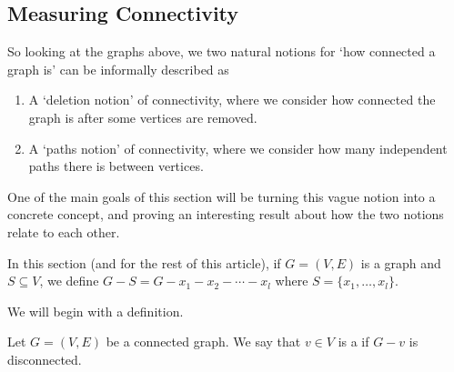 \documentclass[a4paper]{scrartcl}
\begin{document}
\subsection{Measuring Connectivity}

So looking at the graphs above, we two natural notions for `how connected a graph is' can be informally described as
\begin{enumerate}
	\item A `deletion notion' of connectivity, where we consider how connected the graph is after some vertices are removed.
	\item A `paths notion' of connectivity, where we consider how many independent paths there is between vertices.
\end{enumerate}

One of the main goals of this section will be turning this vague notion into a concrete concept, and proving an interesting result about how the two notions relate to each other.

\begin{notation}
	In this section (and for the rest of this article), if $G = (V, E)$ is a graph and $S \subseteq V$, we define $G - S = G - x_1 - x_2 - \cdots - x_l$ where $S = \{x_1, \dots, x_l\}$.
\end{notation}

We will begin with a definition.

\begin{definition}
Let $G = (V, E)$ be a connected graph. We say that $v \in V$ is a  if $G - v$ is disconnected.	
\end{definition}
\end{document}
